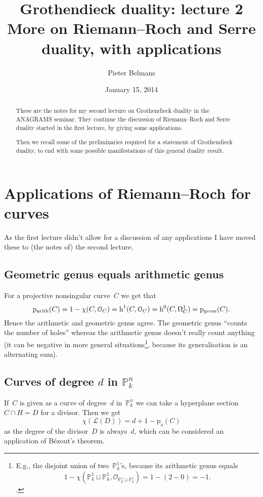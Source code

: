 \documentclass[10pt,a4paper]{article}
\title{Grothendieck duality: lecture 2 \\[.2em] \Large More on Riemann--Roch and Serre duality, with applications}
\author{Pieter Belmans}
\date{January 15, 2014}
\begin{document}
\maketitle

\begin{abstract}
  These are the notes for my second lecture on Grothendieck duality in the ANAGRAMS seminar. They continue the discussion of Riemann--Roch and Serre duality started in the first lecture, by giving some applications.

  Then we recall some of the preliminaries required for a statement of Grothendieck duality, to end with some possible manifestations of this general duality result.
\end{abstract}

\tableofcontents

\clearpage

\section{Applications of Riemann--Roch for curves}
\label{section:applications-curves}
As the first lecture didn't allow for a discussion of any applications I have moved these to (the notes of) the second lecture.

\subsection{Geometric genus equals arithmetic genus}
For a projective nonsingular curve~$C$ we get that
\begin{equation}
  \mathrm{p}_{\mathrm{arith}}(C)=1-\chi(C,\mathcal{O}_C)=\operatorname{h}^1(C,\mathcal{O}_C)=\operatorname{h}^0(C,\Omega_C^1)=\mathrm{p}_{\mathrm{geom}}(C).
\end{equation}
Hence the arithmetic and geometric genus agree. The geometric genus ``counts the number of holes'' whereas the arithmetic genus doesn't really count anything (it can be negative in more general situations\footnote{E.g., the disjoint union of two~$\mathbb{P}_k^1$'s, because its arithmetic genus equals\begin{equation}1-\chi(\mathbb{P}_k^1\sqcup\mathbb{P}_k^1,\mathcal{O}_{\mathbb{P}_k^1\sqcup\mathbb{P}_k^1})=1-(2-0)=-1.\end{equation}.}, because its generalisation is an alternating sum).

\subsection{Curves of degree \texorpdfstring{$d$}{d} in \texorpdfstring{$\mathbb{P}_k^n$}{n-dimensional projective space}}
If~$C$ is given as a curve of degree~$d$ in~$\mathbb{P}_k^n$ we can take a hyperplane section~$C\cap H=D$ for a divisor. Then we get
\begin{equation}
  \chi(\mathcal{L}(D))=d+1-\mathrm{p}_{\mathrm{a}}(C)
\end{equation}
as the degree of the divisor~$D$ is always~$d$, which can be considered an application of B\'ezout's theorem.
\end{document}
